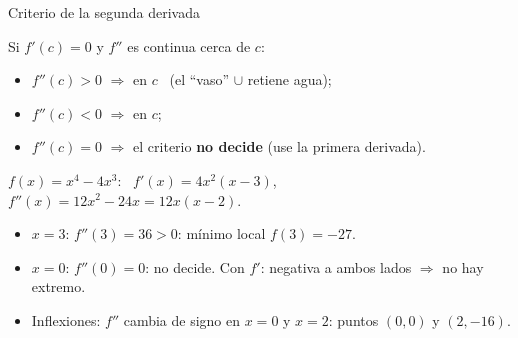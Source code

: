 \documentclass[10pt,aspectratio=169]{beamer}
\begin{document}
\begin{frame}{Criterio de la segunda derivada}
  \begin{teorema}
    Si $f'(c)=0$ y $f''$ es continua cerca de $c$:
    \begin{itemize}
      \item $f''(c)>0$ $\Rightarrow$  en $c$ \ (el ``vaso'' $\cup$ retiene agua);
      \item $f''(c)<0$ $\Rightarrow$  en $c$;
      \item $f''(c)=0$ $\Rightarrow$ el criterio \textbf{no decide} (use la primera derivada).
    \end{itemize}
  \end{teorema}
  \begin{ejemplo}[5]
    $f(x)=x^4-4x^3$: \ $f'(x)=4x^2(x-3)$, \ $f''(x)=12x^2-24x=12x(x-2)$.
    \begin{itemize}
      \item $x=3$: $f''(3)=36>0$: mínimo local $f(3)=-27$.
      \item $x=0$: $f''(0)=0$: no decide. Con $f'$: negativa a ambos lados $\Rightarrow$ no hay extremo.
      \item Inflexiones: $f''$ cambia de signo en $x=0$ y $x=2$: puntos $(0,0)$ y $(2,-16)$.
    \end{itemize}
  \end{ejemplo}
\end{frame}
\end{document}
